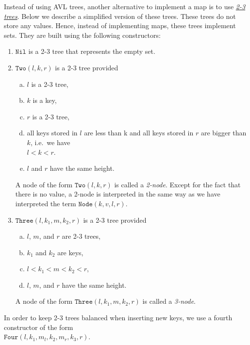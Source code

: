 \exercise
Instead of using AVL trees, another alternative to implement a map is to use 
\href{https://en.wikipedia.org/wiki/2-3_tree}{\emph{2-3 trees}}.  
Below we describe a simplified version of these trees.  These trees do not store any values.  Hence, instead
of implementing maps, these trees implement sets. They are built using the following constructors:
\begin{enumerate}
\item $\mathtt{Nil}$ is a 2-3 tree that represents the empty set.
\item $\mathtt{Two}(l, k, r)$ is a 2-3 tree provided
      \begin{enumerate}[(a)]
      \item $l$ is a 2-3 tree,
      \item $k$ is a key,
      \item $r$ is a 2-3 tree,
      \item all keys stored in $l$ are less than k and all keys stored in $r$ are bigger than $k$,
            i.e.~we have
            \\[0.2cm]
            \hspace*{1.3cm}
            $l < k < r$.
      \item $l$ and $r$ have the same height.
      \end{enumerate}
      A node of the form  $\mathtt{Two}(l, k, r)$ is called a \emph{2-node}.  Except for the fact
      that there is no value, a 2-node is
      interpreted in the same way as we have interpreted the term $\mathtt{Node}(k, v, l, r)$.
\item $\mathtt{Three}(l, k_1, m, k_2, r)$ is a 2-3 tree provided
      \begin{enumerate}[(a)]
      \item $l$, $m$, and $r$ are 2-3 trees,
      \item $k_1$ and $k_2$ are keys,
      \item $l < k_1 < m < k_2 < r$,
      \item $l$, $m$, and $r$ have the same height.
      \end{enumerate}
      A node of the form  $\mathtt{Three}(l, k_1, m, k_2, r)$ is called a \emph{3-node}.
\end{enumerate}
In order to keep 2-3 trees balanced when inserting new keys, we use a fourth constructor of the form
\\[0.2cm]
\hspace*{1.3cm}
$\mathtt{Four}(l,k_1,m_l, k_2, m_r, k_3, r)$.
\\[0.2cm]
